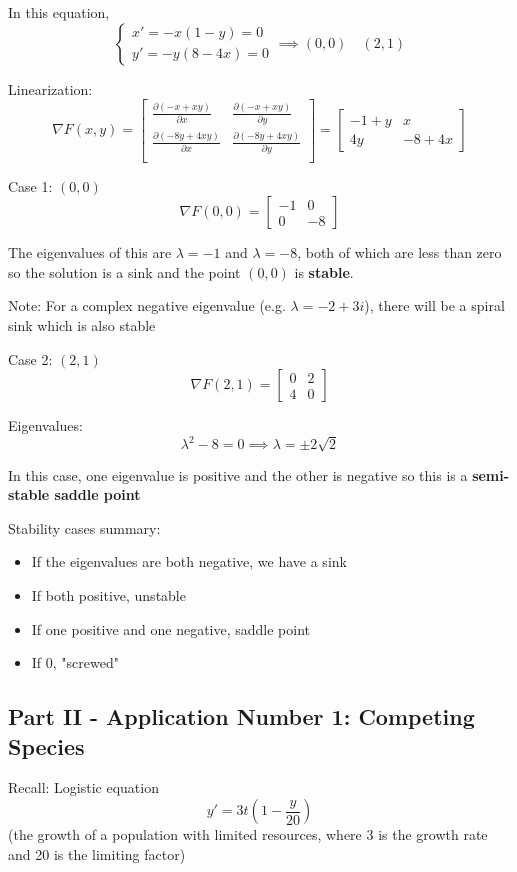 \documentclass[12pt]{article}
\begin{document}
In this equation,
\[\begin{cases}
    x' = -x(1 - y) = 0\\
    y' = -y(8 - 4x) = 0
\end{cases} \implies (0, 0) \quad (2, 1)\]

Linearization:
\[\nabla F(x, y) = \begin{bmatrix}
    \frac{\partial (-x + xy)}{\partial x} & \frac{\partial (-x + xy)}{\partial y}\\
    \frac{\partial (-8y + 4xy)}{\partial x} & \frac{\partial (-8y + 4xy)}{\partial y}\\
\end{bmatrix} = \begin{bmatrix}
    -1 + y & x\\
    4y & -8 + 4x
\end{bmatrix}\]

Case 1: $(0, 0)$
\[\nabla F(0, 0) = \begin{bmatrix}
    -1 & 0\\
    0 & -8
\end{bmatrix}\]

The eigenvalues of this are $\lambda = -1$ and $\lambda = - 8$, both of which are less than zero so the solution is a sink and the point $(0, 0)$ is \textbf{stable}.

Note: For a complex negative eigenvalue (e.g. $\lambda = -2 + 3i$), there will be a spiral sink which is also stable

Case 2: $(2, 1)$
\[\nabla F(2, 1) = \begin{bmatrix}
    0 & 2\\
    4 & 0
\end{bmatrix}\]

Eigenvalues:
\[\lambda^2 - 8 = 0 \implies \lambda = \pm 2\sqrt{2}\]

In this case, one eigenvalue is positive and the other is negative so this is a \textbf{semi-stable saddle point}

Stability cases summary:
\begin{itemize}
    \item If the eigenvalues are both negative, we have a sink
    \item If both positive, unstable
    \item If one positive and one negative, saddle point
    \item If 0, "screwed"
\end{itemize}

\subsection*{Part II - Application Number 1: Competing Species}
Recall: Logistic equation 
\[y' = 3t \left(1 - \frac{y}{20}\right)\]
(the growth of a population with limited resources, where 3 is the growth rate and 20 is the limiting factor)
\end{document}
